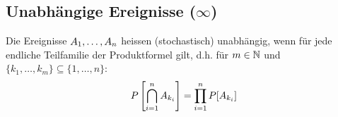 \subsection{Unabhängige Ereignisse  ($\infty$)}
Die Ereignisse $A_1, \dots, A_n$ heissen (stochastisch) unabhängig, wenn für jede
endliche Teilfamilie der Produktformel gilt, d.h. für $m \in \mathbb{N}$ und $\{k_1,
  \dots, k_m\} \subseteq \{1, \dots, n\}$:
\begin{align*}
  P \left[\bigcap_{i = 1}^n A_{k_i} \right] = \prod_{i = 1}^n P[A_{k_i}]
\end{align*}
